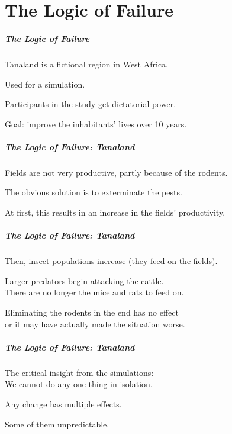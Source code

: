 \part{The Logic of Failure}
\frame{\partpage}

\begin{frame}
\frametitle{The Logic of Failure}
\begin{changemargin}{1cm}
\alert{Tanaland} is a fictional region in West Africa.

Used for a simulation.

Participants in the study get dictatorial power.

Goal: improve the inhabitants' lives over 10 years. 

\end{changemargin}
\end{frame}


\begin{frame}
\frametitle{The Logic of Failure: Tanaland}
\begin{changemargin}{1cm}

Fields are not very productive, partly because of the rodents.

The obvious solution is to exterminate the pests. 

At first, this results in an increase in the fields' productivity.

\end{changemargin}
\end{frame}


\begin{frame}
\frametitle{The Logic of Failure: Tanaland}
\begin{changemargin}{1cm}

Then, insect populations increase (they feed on the fields).

Larger predators begin attacking the cattle.\\
\quad There are no longer the mice and rats to feed on.

Eliminating the rodents in the end has no effect\\ 
\quad or it may have actually made the situation worse. 

\end{changemargin}
\end{frame}

\begin{frame}
\frametitle{The Logic of Failure: Tanaland}
\begin{changemargin}{1cm}

The critical insight from the simulations:\\
\quad We cannot do any one thing in isolation. 

Any change has multiple effects.

Some of them unpredictable.

\end{changemargin}
\end{frame}

